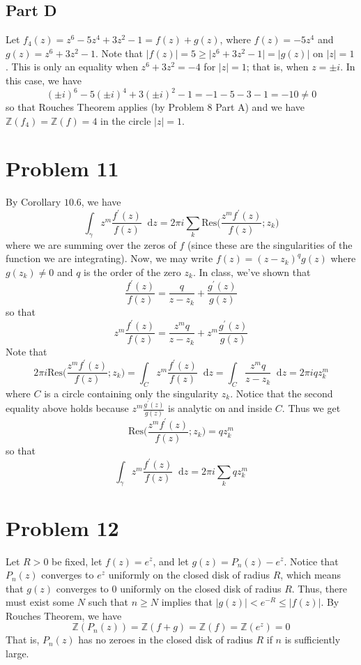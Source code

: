 \documentclass[12pt]{article}
\newcommand{\zz}{\mathbb Z}
\newcommand*\diff{\mathop{}\!\mathrm{d}}
\begin{document}
\subsection*{Part D}
Let $f_4(z) = z^6 - 5z^4 + 3z^2 - 1 = f(z) + g(z)$, where $f(z) = -5z^4$ and $g(z) = z^6 + 3z^2 - 1$. Note that $\vert f(z) \vert = 5 \geq \vert z^6 + 3z^2 - 1 \vert = \vert g(z) \vert$ on $\vert z \vert = 1$. This is only an equality when $z^6 + 3z^2 = -4$ for $\vert z \vert = 1$; that is, when $z = \pm i$. In this case, we have 
\[
(\pm i)^6 - 5(\pm i)^4 + 3(\pm i)^2 - 1 = -1 - 5 - 3 - 1 = -10 \neq 0
\] so that Rouches Theorem applies (by Problem 8 Part A) and we have $\zz(f_4) = \zz(f) = 4$ in the circle $\vert z \vert = 1$.
\newpage
\section*{Problem 11}
By Corollary $10.6$, we have
\[
\int_\gamma z^m \frac{f^\prime(z)}{f(z)} \diff z = 2\pi i \sum_{k} \text{Res}\bigg(\frac{z^m f^\prime(z)}{f(z)}; z_k\bigg) 
\] where we are summing over the zeros of $f$ (since these are the singularities of the function we are integrating). Now, we may write $f(z) = (z-z_k)^q g(z)$ where $g(z_k) \neq 0$ and $q$ is the order of the zero $z_k$. In class, we've shown that
\[
\frac{f^\prime(z)}{f(z)} = \frac{q}{z-z_k}  + \frac{g^\prime(z)}{g(z)}
\] so that
\[
z^m \frac{f^\prime(z)}{f(z)} = \frac{z^mq}{z-z_k}  + z^m\frac{g^\prime(z)}{g(z)}
\] Note that
\[
2\pi i \text{Res}\bigg(\frac{z^m f^\prime(z)}{f(z)}; z_k\bigg) = \int_C z^m \frac{f^\prime(z)}{f(z)} \diff z = \int_C \frac{z^mq}{z-z_k} \diff z = 2\pi i qz_k^m
\] where $C$ is a circle containing only the singularity $z_k$. Notice that the second equality above holds because $z^m\frac{g^\prime(z)}{g(z)}$ is analytic on and inside $C$. Thus we get 
\[
\text{Res}\bigg(\frac{z^m f^\prime(z)}{f(z)}; z_k\bigg)  = qz_k^m
\] so that
\[
\int_\gamma z^m \frac{f^\prime(z)}{f(z)} \diff z = 2\pi i \sum_{k} qz_k^m 
\]
\newpage
\section*{Problem 12}
Let $R > 0$ be fixed, let $f(z) = e^z$, and let $g(z) = P_n(z) - e^z$. Notice that $P_n(z)$ converges to $e^z$ uniformly on the closed disk of radius $R$, which means that $g(z)$ converges to $0$ uniformly on the closed disk of radius $R$. Thus, there must exist some $N$ such that $n \geq N$ implies that $\vert g(z) \vert < e^{-R} \leq \vert f(z) \vert$. By Rouches Theorem, we have
\[
\zz(P_n(z)) = \zz(f+g) = \zz(f) = \zz(e^z) = 0
\] That is, $P_n(z)$ has no zeroes in the closed disk of radius $R$ if $n$ is sufficiently large.
\newpage
\end{document}
